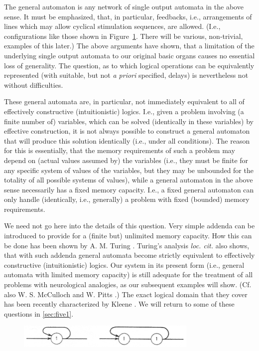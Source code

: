 \documentclass[twocolumn,preprintnumbers,amsmath,amssymb,floatfix]{revtex4}
\begin{document}
The general automaton is any network of single output automata in
the above sense. It must be emphasized, that, in particular,
feedbacks, i.e., arrangements of lines which may allow cyclical
stimulation sequences, are allowed. (I.e., configurations like
those shown in Figure~\ref{fig:7}. There will be various,
non-trivial, examples of this later.) The above arguments have
shown, that a limitation of the underlying single output automata
to our original basic organs causes no essential loss of
generality. The question, as to which logical operations can be
equivalently represented (with suitable, but not \textit{a priori}
specified, delays) is nevertheless not without difficulties.

These general automata are, in particular, not immediately
equivalent to all of effectively constructive (intuitionistic)
logics. I.e., given a problem involving (a finite number of)
variables, which can be solved (identically in these variables) by
effective construction, it is not always possible to construct a
general automaton that will produce this solution identically
(i.e., under all conditions). The reason for this is essentially,
that the memory requirements of such a problem may depend on
(actual values assumed by) the variables (i.e., they must be
finite for any specific system of values of the variables, but
they may be unbounded for the totality of all possible systems of
values), while a general automaton in the above sense necessarily
has a fixed memory capacity. I.e., a fixed general automaton can
only handle (identically, i.e., generally) a problem with fixed
(bounded) memory requirements.

We need not go here into the details of this question. Very simple
addenda can be introduced to provide for a (finite but) unlimited
memory capacity. How this can be done has been shown by A. M.
Turing \cite{Turing36}. Turing's analysis \textit{loc. cit.} also
shows, that with such addenda general automata become strictly
equivalent to effectively constructive (intuitionistic) logics.
Our system in its present form (i.e., general automata with
limited memory capacity) is still adequate for the treatment of
all problems with neurological analogies, as our subsequent
examples will show. (Cf. also W. S. McCulloch and W. Pitts
\cite{McCulloch43}.) The exact logical domain that they cover has
been recently characterized by Kleene \cite{Kleene56}. We will
return to some of these questions in \ref{sec:five1}.

\begin{figure}[t]
\includegraphics[width=3.4in]{fig_7}
\caption{\label{fig:7}}
\end{figure}
\end{document}
